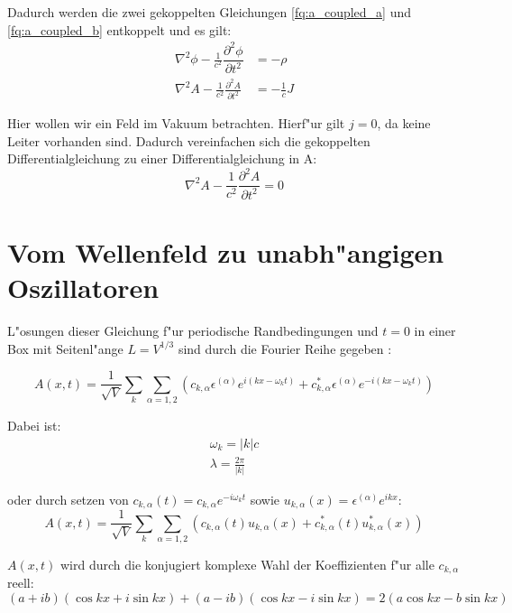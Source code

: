 Dadurch werden die zwei gekoppelten Gleichungen \ref{fq:a_coupled_a} und \ref{fq:a_coupled_b} entkoppelt und es gilt:
\begin{align}
\nabla^2 \phi - \frac{1}{c^2} \dfrac{\partial^2 \phi}{\partial t^2} &= -\rho \\
\nabla^2 A - \frac{1}{c^2} \frac{\partial^2 A }{\partial t^2} &= - \frac{1}{c} J
\end{align}

Hier wollen wir ein Feld im Vakuum betrachten. Hierf"ur gilt $j = 0$, da keine Leiter vorhanden sind.
Dadurch vereinfachen sich die gekoppelten Differentialgleichung zu einer Differentialgleichung in A:
\begin{equation} \label{fq:wave_dgl}
\nabla^2 A - \frac{1}{c^2} \frac{\partial^2 A }{\partial t^2} = 0
\end{equation}

\section{Vom Wellenfeld zu unabh"angigen Oszillatoren}
L"osungen dieser Gleichung f"ur periodische Randbedingungen und $t=0$ in einer Box mit Seitenl"ange $L = V^{1/3}$ sind durch die Fourier Reihe gegeben \cite{fq:em_wave_eq}:

\begin{equation} \label{fq:wave_eq}
A(x,t) = \frac{1}{\sqrt{V}} \sum_k \sum_{\alpha=1,2} (c_{k,\alpha} \epsilon^{(\alpha)} e^{i (kx - \omega_k t)} + c^*_{k,\alpha} \epsilon^{(\alpha)} e^{-i(kx - \omega_k t)})
\end{equation}

Dabei ist:
\begin{align}
\omega_k=|k|c \\
\lambda = \frac{2 \pi}{|k|}
\end{align}

oder durch setzen von $c_{k,\alpha}(t) = c_{k,\alpha} e^{-i \omega_k t}$ sowie $u_{k,\alpha}(x) = \epsilon^{(\alpha)} e^{ikx}$:
\begin{equation}
A(x,t) = \frac{1}{\sqrt{V}} \sum_k \sum_{\alpha=1,2} (c_{k,\alpha}(t)u_{k,\alpha}(x) + c^*_{k,\alpha}(t) u^*_{k,\alpha}(x))
\end{equation}

$A(x,t)$ wird durch die konjugiert komplexe Wahl der Koeffizienten f"ur alle $c_{k,\alpha}$ reell:
\begin{equation}
(a + ib)(\cos kx + i \sin kx ) + (a - ib)(\cos kx - i \sin kx ) = 2 ( a \cos kx - b \sin kx )
\end{equation}

